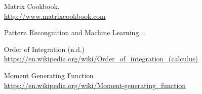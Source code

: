 \documentclass{article}
\begin{document}
\begin{thebibliography}{10}
		Matrix Cookbook.
		\quad
		 \\
		\href{http://www.matrixcookbook.com}{\url{http://www.matrixcookbook.com}}

		Pattern Recongnition and Machine Learning.
		.
		\quad

		Order of Integration (n.d.)
		 \\
		\href{https://en.wikipedia.org/wiki/Order_of_integration_(calculus)}{\url{https://en.wikipedia.org/wiki/Order_of_integration_(calculus)}}

		Moment Generating Function
		 \\
		\href{https://en.wikipedia.org/wiki/Moment-generating_function}{\url{https://en.wikipedia.org/wiki/Moment-generating_function}}
\end{thebibliography}
\end{document}
